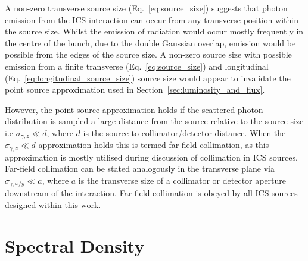 \documentclass[../main.tex]{subfiles}
\begin{document}
A non-zero transverse source size (Eq.~\ref{eq:source_size}) suggests that photon emission from the ICS interaction can occur from any transverse position within the source size. Whilst the emission of radiation would occur mostly frequently in the centre of the bunch, due to the double Gaussian overlap, emission would be possible from the edges of the source size. A non-zero source size with possible emission from a finite transverse (Eq.~\ref{eq:source_size}) and longitudinal (Eq.~\ref{eq:longitudinal_source_size}) source size would appear to invalidate the point source approximation used in Section~\ref{sec:luminosity_and_flux}.

However, the point source approximation holds if the scattered photon distribution is sampled a large distance from the source relative to the source size i.e $\sigma_{\gamma,z} \ll d$, where $d$ is the source to collimator/detector distance. When the $\sigma_{\gamma,z} \ll d$ approximation holds this is termed far-field collimation, as this approximation is mostly utilised during discussion of collimation in ICS sources. Far-field collimation can be stated analogously in the transverse plane via $\sigma_{\gamma,x/y} \ll a$, where $a$ is the transverse size of a collimator or detector aperture downstream of the interaction. Far-field collimation is obeyed by all ICS sources designed within this work.  

\section{Spectral Density}
\end{document}
